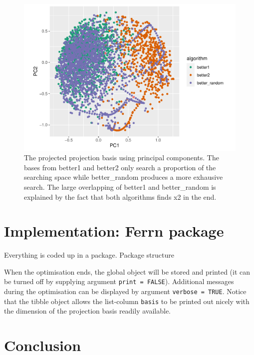 \documentclass[12pt]{article}
\begin{document}
\begin{figure}
\centering
\includegraphics{paper_files/figure-latex/1d-2var-explore-proj-pca-1.pdf}
\caption{\label{1d-2var-explore-proj-pca} The projected projection basis
using principal components. The bases from better1 and better2 only
search a proportion of the searching space while better\_random produces
a more exhausive search. The large overlapping of better1 and
better\_random is explained by the fact that both algorithms finds x2 in
the end.}
\end{figure}

\hypertarget{implementation}{%
\section{Implementation: Ferrn package}\label{implementation}}

Everything is coded up in a package. Package structure

When the optimisation ends, the global object will be stored and printed
(it can be turned off by supplying argument \texttt{print\ =\ FALSE}).
Additional messages during the optimisation can be displayed by argument
\texttt{verbose\ =\ TRUE}. Notice that the tibble object allows the
list-column \texttt{basis} to be printed out nicely with the dimension
of the projection basis readily available.

\hypertarget{conclusion}{%
\section{Conclusion}\label{conclusion}}

\clearpage



\end{document}
